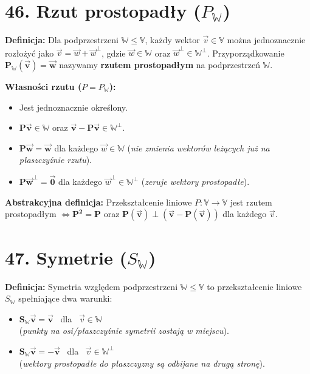 \documentclass[12pt,a4paper]{article}
\begin{document}
\section*{46. Rzut prostopadły ($P_{\mathbb{W}}$)}
\noindent\textbf{Definicja:} Dla podprzestrzeni $\mathbb{W} \le \mathbb{V}$, każdy wektor $\vec{v} \in \mathbb{V}$ można jednoznacznie rozłożyć jako $\vec{v} = \vec{w} + \vec{w}^\perp$, gdzie $\vec{w} \in \mathbb{W}$ oraz $\vec{w}^\perp \in \mathbb{W}^\perp$. %
Przyporządkowanie $\mathbf{P_{\mathbb{W}}(\vec{v}) = \vec{w}}$ nazywamy \textbf{rzutem prostopadłym} na podprzestrzeń $\mathbb{W}$. %

\noindent\textbf{Własności rzutu ($P = P_{\mathbb{W}}$):} %
\begin{itemize}
    \item Jest jednoznacznie określony. %
    \item $\mathbf{P\vec{v} \in \mathbb{W}}$ oraz $\mathbf{\vec{v} - P\vec{v} \in \mathbb{W}^\perp}$. %
    \item $\mathbf{P\vec{w} = \vec{w}}$ dla każdego $\vec{w} \in \mathbb{W}$ (\textit{nie zmienia wektorów leżących już na płaszczyźnie rzutu}). %
    \item $\mathbf{P\vec{w}^\perp = \vec{0}}$ dla każdego $\vec{w}^\perp \in \mathbb{W}^\perp$ (\textit{zeruje wektory prostopadłe}). %
\end{itemize}

\noindent\textbf{Abstrakcyjna definicja:} Przekształcenie liniowe $P: \mathbb{V} \to \mathbb{V}$ jest rzutem prostopadłym $\iff \mathbf{P^2 = P}$ oraz $\mathbf{P(\vec{v}) \perp (\vec{v} - P(\vec{v}))}$ dla każdego $\vec{v}$. %

\section*{47. Symetrie ($S_{\mathbb{W}}$)}
\noindent\textbf{Definicja:} Symetria względem podprzestrzeni $\mathbb{W} \le \mathbb{V}$ to przekształcenie liniowe $S_{\mathbb{W}}$ spełniające dwa warunki: %
\begin{itemize}
    \item $\mathbf{S_{\mathbb{W}}\vec{v} = \vec{v}}$ \ dla \ $\vec{v} \in \mathbb{W}$ \\
    (\textit{punkty na osi/płaszczyźnie symetrii zostają w miejscu}). %
    \item $\mathbf{S_{\mathbb{W}}\vec{v} = -\vec{v}}$ \ dla \ $\vec{v} \in \mathbb{W}^\perp$ \\
    (\textit{wektory prostopadłe do płaszczyzny są odbijane na drugą stronę}). %
\end{itemize}
\end{document}
